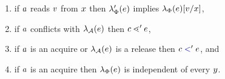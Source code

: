 \begin{definition}
\begin{enumerate}
\item\label{pre-read} if $a$ reads $v$ from $x$ then
   $\lambda_{\Phi}'(e)$ implies $\lambda_{\Phi}(e)[v/x]$, %
\item\label{pre-coherence} if $a$ conflicts with $\lambda_{\mathcal{A}}(e)$ 
    then $c \lessdot' e$,
\item\label{pre-sync} if $a$ is an acquire or $\lambda_{\mathcal{A}}(e)$ is a release then $c \mathrel{{\color{blue}<}}' e$, and
\item\label{pre-acquire} if $a$ is an acquire then $\lambda_{\Phi}(e)$ is independent of every $y$.

\end{enumerate}
\end{definition}
